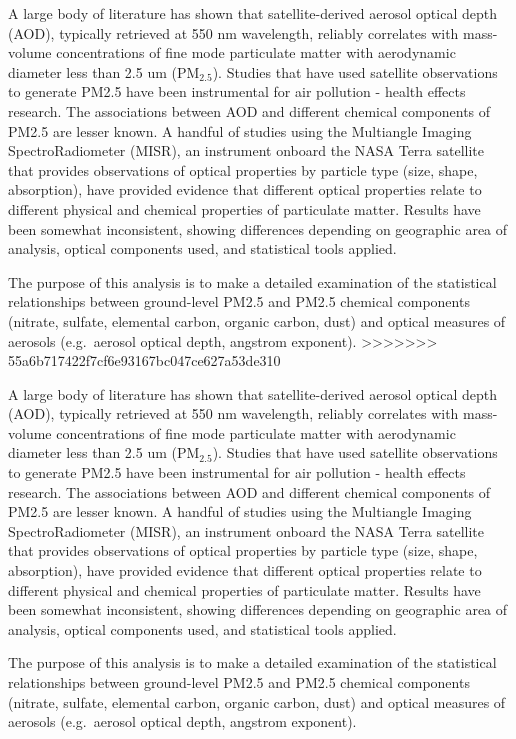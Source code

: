 \documentclass[, manuscript]{copernicus}
\begin{document}
A large body of literature has shown that satellite-derived aerosol
optical depth (AOD), typically retrieved at 550 nm wavelength, reliably
correlates with mass-volume concentrations of fine mode particulate
matter with aerodynamic diameter less than 2.5 um (PM\(_{2.5}\)).
Studies that have used satellite observations to generate PM2.5 have
been instrumental for air pollution - health effects research. The
associations between AOD and different chemical components of PM2.5 are
lesser known. A handful of studies using the Multiangle Imaging
SpectroRadiometer (MISR), an instrument onboard the NASA Terra satellite
that provides observations of optical properties by particle type (size,
shape, absorption), have provided evidence that different optical
properties relate to different physical and chemical properties of
particulate matter. Results have been somewhat inconsistent, showing
differences depending on geographic area of analysis, optical components
used, and statistical tools applied.

The purpose of this analysis is to make a detailed examination of the
statistical relationships between ground-level PM2.5 and PM2.5 chemical
components (nitrate, sulfate, elemental carbon, organic carbon, dust)
and optical measures of aerosols (e.g.~aerosol optical depth, angstrom
exponent).
>>>>>>> 55a6b717422f7cf6e93167bc047ce627a53de310

A large body of literature has shown that satellite-derived aerosol
optical depth (AOD), typically retrieved at 550 nm wavelength, reliably
correlates with mass-volume concentrations of fine mode particulate
matter with aerodynamic diameter less than 2.5 um (PM\(_{2.5}\)).
Studies that have used satellite observations to generate PM2.5 have
been instrumental for air pollution - health effects research. The
associations between AOD and different chemical components of PM2.5 are
lesser known. A handful of studies using the Multiangle Imaging
SpectroRadiometer (MISR), an instrument onboard the NASA Terra satellite
that provides observations of optical properties by particle type (size,
shape, absorption), have provided evidence that different optical
properties relate to different physical and chemical properties of
particulate matter. Results have been somewhat inconsistent, showing
differences depending on geographic area of analysis, optical components
used, and statistical tools applied.

The purpose of this analysis is to make a detailed examination of the
statistical relationships between ground-level PM2.5 and PM2.5 chemical
components (nitrate, sulfate, elemental carbon, organic carbon, dust)
and optical measures of aerosols (e.g.~aerosol optical depth, angstrom
exponent).
\end{document}
